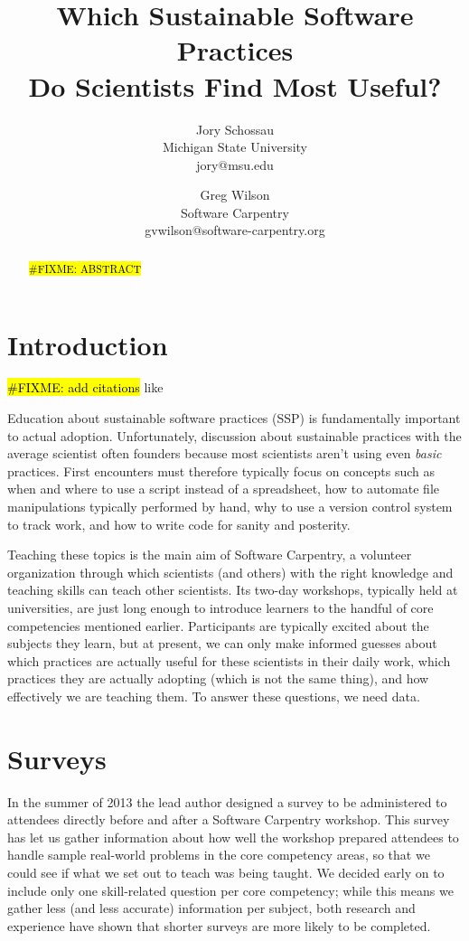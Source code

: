 \documentclass[10pt, twocolumn]{article}
\title{Which Sustainable Software Practices\\ Do Scientists Find Most Useful?}
\author{
	Jory Schossau \\
	\small{Michigan State University} \\
	\small{jory@msu.edu}
	\and
	Greg Wilson \\
	\small{Software Carpentry} \\
	\small{gvwilson@software-carpentry.org}
}
\newcommand{\fixme}[1]{\hl{\#FIXME: #1}}
\begin{document}
	\maketitle
	
	\begin{abstract}
		\fixme{ABSTRACT}
	\end{abstract}
	
	\section{Introduction}
	
	\fixme{add citations} like \cite{b:hannay2009}
	
	Education about sustainable software practices (SSP)
	is fundamentally important to actual adoption.
	Unfortunately,
	discussion about sustainable practices with the average scientist often founders
	because most scientists aren't using even \emph{basic} practices.
	First encounters must therefore typically focus on concepts such as
	when and where to use a script instead of a spreadsheet,
	how to automate file manipulations typically performed by hand,
	why to use a version control system to track work,
	and how to write code for sanity and posterity.
	
	Teaching these topics is the main aim of Software Carpentry,
	a volunteer organization through which scientists (and others)
	with the right knowledge and teaching skills can teach other scientists.
	Its two-day workshops,
	typically held at universities,
	are just long enough to introduce learners to the handful of core competencies mentioned earlier.
	Participants are typically excited about the subjects they learn,
	but at present,
	we can only make informed guesses about
	which practices are actually useful for these scientists in their daily work,
	which practices they are actually adopting (which is not the same thing),
	and how effectively we are teaching them.
	To answer these questions,
	we need data.
	
	\section{Surveys}
	In the summer of 2013
	the lead author designed a survey
	to be administered to attendees directly before and after a Software Carpentry workshop.
	This survey has let us gather information about
	how well the workshop prepared attendees to handle sample real-world problems in the core competency areas,
	so that we could see if what we set out to teach was being taught.
	We decided early on to include only one skill-related question per core competency;
	while this means we gather less (and less accurate) information per subject,
	both research and experience have shown that shorter surveys are more likely to be completed.
	
\end{document}
